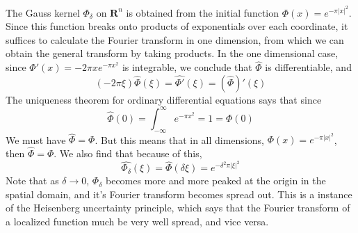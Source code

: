 \begin{example}
	The Gauss kernel $\Phi_\delta$ on $\mathbf{R}^n$ is obtained from the initial function $\Phi(x) = e^{-\pi |x|^2}$. Since this function breaks onto products of exponentials over each coordinate, it suffices to calculate the Fourier transform in one dimension, from which we can obtain the general transform by taking products. In the one dimensional case, since $\Phi'(x) = -2 \pi x e^{- \pi x^2}$ is integrable, we conclude that $\widehat{\Phi}$ is differentiable, and
	\[ (- 2 \pi \xi) \widehat{\Phi}(\xi) = \widehat{\Phi'}(\xi) = (\widehat{\Phi})'(\xi) \]
	The uniqueness theorem for ordinary differential equations says that since
	\[ \widehat{\Phi}(0) = \int_{-\infty}^\infty e^{- \pi x^2} = 1 = \Phi(0) \]
	We must have $\widehat{\Phi} = \Phi$. But this means that in all dimensions, $\Phi(x) = e^{- \pi |x|^2}$, then $\widehat{\Phi} = \Phi$. We also find that because of this,
	\[ \widehat{\Phi_\delta}(\xi) = \widehat{\Phi}(\delta \xi) = e^{- \delta^2 \pi |\xi|^2} \]
	Note that as $\delta \to 0$, $\Phi_\delta$ becomes more and more peaked at the origin in the spatial domain, and it's Fourier transform becomes spread out. This is a instance of the Heisenberg uncertainty principle, which says that the Fourier transform of a localized function much be very well spread, and vice versa.
\end{example}

